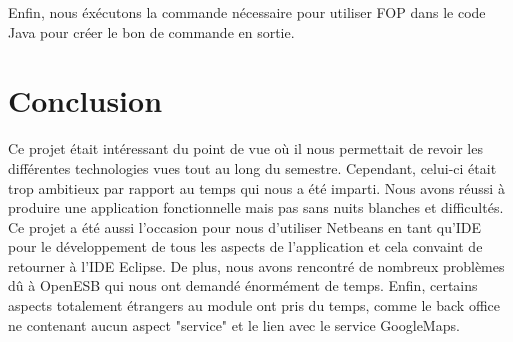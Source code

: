 \documentclass[11pt,a4paper]{article}
\begin{document}
Enfin, nous éxécutons la commande nécessaire pour utiliser FOP dans le code Java
pour créer le bon de commande en sortie.




\section{Conclusion}

Ce projet était intéressant du point de vue où il nous permettait de revoir les
différentes technologies vues tout au long du semestre. Cependant, celui-ci
était trop ambitieux par rapport au temps qui nous a été imparti. Nous avons
réussi à produire une application fonctionnelle mais pas sans nuits blanches et
difficultés. Ce projet a été aussi l'occasion pour nous d'utiliser Netbeans en
tant qu'IDE pour le développement de tous les aspects de l'application et cela
convaint de retourner à l'IDE Eclipse. De plus, nous avons rencontré de
nombreux problèmes dû à OpenESB qui nous ont demandé énormément de temps.
Enfin, certains aspects totalement étrangers au module ont pris du temps, comme
le back office ne contenant aucun aspect "service" et le lien avec le service
GoogleMaps.
\end{document}
